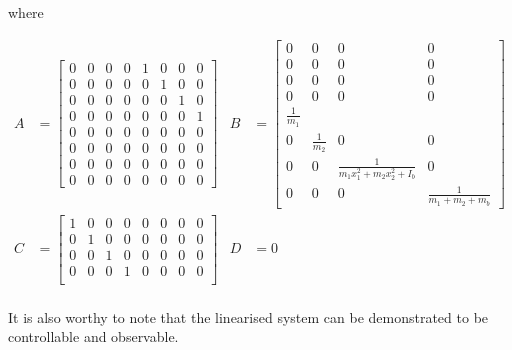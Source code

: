 \documentclass{UoNMCHA}
\numberwithin{equation}{section}
\begin{document}
	
	where 
	
	\begin{align*}
	A & = 
	\begin{bmatrix}
	0 & 0 & 0 & 0 & 1 & 0 & 0 & 0 \\
	0 & 0 & 0 & 0 & 0 & 1 & 0 & 0 \\
	0 & 0 & 0 & 0 & 0 & 0 & 1 & 0 \\
	0 & 0 & 0 & 0 & 0 & 0 & 0 & 1 \\
	0 & 0 & 0 & 0 & 0 & 0 & 0 & 0 \\
	0 & 0 & 0 & 0 & 0 & 0 & 0 & 0 \\
	0 & 0 & 0 & 0 & 0 & 0 & 0 & 0 \\
	0 & 0 & 0 & 0 & 0 & 0 & 0 & 0
	\end{bmatrix} & 
	B & = 
	\begin{bmatrix}
	0 & 0 & 0 & 0 \\
	0 & 0 & 0 & 0 \\
	0 & 0 & 0 & 0 \\
	0 & 0 & 0 & 0 \\
	\frac{1}{m_{1}} & & & \\
	0 & \frac{1}{m_{2}} & 0 & 0 \\
	0 & 0 & \frac{1}{m_1 x_1^2 + m_2 x_2^2 + I_b} & 0 \\
	0 & 0 & 0 & \frac{1}{m_1  + m_2  + m_b}
	\end{bmatrix} \\
	C & = 
	\begin{bmatrix}
	1 & 0 & 0 & 0 & 0 & 0 & 0 & 0 \\
	0 & 1 & 0 & 0 & 0 & 0 & 0 & 0 \\
	0 & 0 & 1 & 0 & 0 & 0 & 0 & 0 \\
	0 & 0 & 0 & 1 & 0 & 0 & 0 & 0 \\
	\end{bmatrix} & 
	D & =0 \\
	\end{align*}
	
	
	It is also worthy to note that the linearised system can be demonstrated to be controllable and
	observable.
	
\end{document}
